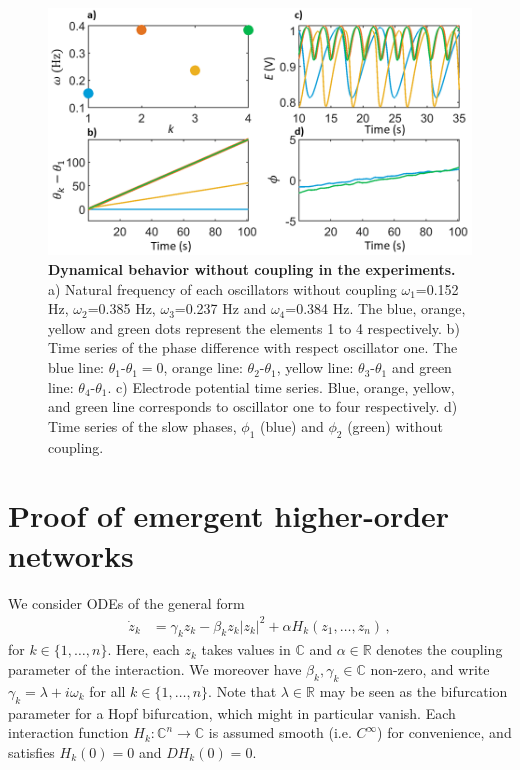 \documentclass[12pt]{article}
\theoremstyle{plain}
\theoremstyle{definition}
\theoremstyle{remark}
\theoremstyle{remark}
\begin{document}
\begin{figure}[!ht]
    \centering
    \includegraphics[width=1\columnwidth]{Slide2_v1.png}
    \caption{{\bf Dynamical behavior without coupling in the experiments.}  a) Natural frequency of each oscillators without coupling $\omega_1$=0.152 Hz, $\omega_2$=0.385 Hz, $\omega_3$=0.237 Hz and $\omega_4$=0.384 Hz.  The blue, orange, yellow and green dots represent the elements 1 to 4 respectively. b) Time series of the phase difference with respect oscillator one. The blue line: $\theta_1$-$\theta_1 = 0$, orange line:  $\theta_2$-$\theta_1$, yellow line:  $\theta_3$-$\theta_1$ and green line:  $\theta_4$-$\theta_1$. c) Electrode potential time series. Blue, orange, yellow, and green line corresponds to oscillator one to four respectively. d)  Time series of the slow phases, $\phi_1$ (blue) and $\phi_2$ (green) without coupling.}
    \label{fig:exp_set}
\end{figure}


\newpage

\section{Proof of emergent higher-order networks}
We consider ODEs of the general form
\begin{align}\label{theODE00}
\dot{z}_k &= \gamma_kz_k - \beta_k z_k|z_k|^2 + \alpha H_k(z_1, \dots, z_n) \, ,
\end{align}
for $k \in \{1, \dots, n\}$. Here, each $z_k$ takes values in $\mathbb{C}$ and $\alpha \in \mathbb{R}$ denotes the coupling parameter of the interaction.  We moreover have $\beta_k, \gamma_k \in \mathbb{C}$ non-zero, and write $\gamma_k = \lambda + i\omega_k$ for all $k \in \{1, \dots, n\}$. Note that $\lambda \in \mathbb{R}$ may be seen as the bifurcation parameter for a Hopf bifurcation, which might in particular vanish. Each interaction function $H_k: \mathbb{C}^n \rightarrow \mathbb{C}$ is assumed smooth (i.e. $C^{\infty}$) for convenience, and satisfies $H_k(0) = 0$ and $DH_k(0) = 0$.\\
\end{document}
